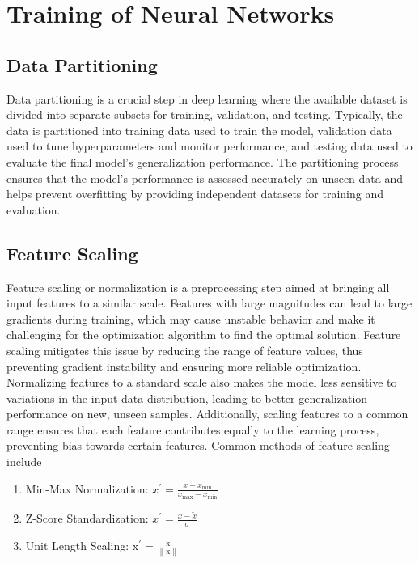 \section{Training of Neural Networks}
\subsection{Data Partitioning}Data partitioning is a crucial step in deep learning where the available dataset is divided into separate subsets for training, validation, and testing. Typically, the data is partitioned into training data used to train the model, validation data used to tune hyperparameters and monitor performance, and testing data used to evaluate the final model's generalization performance. The partitioning process ensures that the model's performance is assessed accurately on unseen data and helps prevent overfitting by providing independent datasets for training and evaluation. 
\subsection{Feature Scaling}Feature scaling or normalization is a preprocessing step aimed at bringing all input features to a similar scale. Features with large magnitudes can lead to large gradients during training, which may cause unstable behavior and make it challenging for the optimization algorithm to find the optimal solution. Feature scaling mitigates this issue by reducing the range of feature values, thus preventing gradient instability and ensuring more reliable optimization. Normalizing features to a standard scale also makes the model less sensitive to variations in the input data distribution, leading to better generalization performance on new, unseen samples. Additionally, scaling features to a common range ensures that each feature contributes equally to the learning process, preventing bias towards certain features. Common methods of feature scaling include
\begin{enumerate}
\item Min-Max Normalization: $x^{\prime}=\frac{x-x_{\min }}{x_{\max }-x_{\min }}$
\item Z-Score Standardization: $x^{\prime}=\frac{x-\tilde{x}}{\sigma}$
\item Unit Length Scaling: $\mathrm{x}^{\prime}=\frac{\mathrm{x}}{\|\mathrm{x}\|}$
\end{enumerate}
